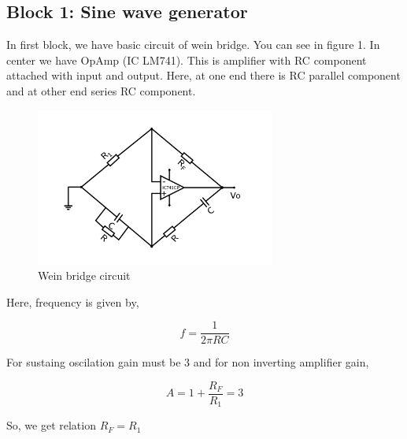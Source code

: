 \documentclass{article}
\begin{document}
\subsection{Block 1: Sine wave generator}
\label{sec:orgc625de2}


In first block, we have basic circuit of wein bridge. You can see in figure 1. In center we have OpAmp (IC LM741). This is amplifier with RC component attached with input and output. Here, at one end there is RC parallel component and at other end series RC component. 


\begin{figure}[ht]
    \centering
    \label{sine}
    \includegraphics[width=0.7\textwidth]{imgs/sine.png}
    \caption{Wein bridge circuit}
\end{figure}

Here, frequency is given by, 

\begin{equation}
\label{eq:org03f5ba8}
  f =\frac{1}{2 \pi RC}
\end{equation}

For sustaing oscilation gain must be 3 and for non inverting amplifier gain, 

\begin{equation}
\label{eq:org073ea81}
  A = 1+\frac{R_{F}}{R_{1}} = 3
\end{equation}

So, we get relation \(R_{F}=R_{1}\)
\end{document}
